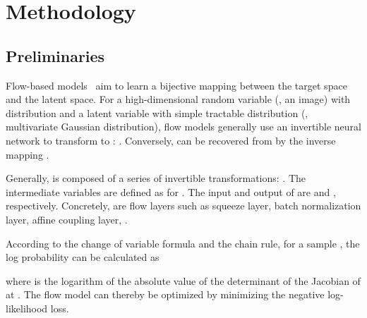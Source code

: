 \documentclass[10pt,twocolumn,letterpaper]{article}
\begin{document}
\section{Methodology}
\subsection{Preliminaries}
Flow-based models~\cite{dinh2014nice, dinh2016realnvp, kingma2016iaf, papamakarios2017maf, huang2018naf, kingma2018glow, ardizzone2018analyzingIRN, jaini2019polyflow, ho2019flow++, nielsen2020survae, liang2021fkp} aim to learn a bijective mapping between the target space and the latent space.
For a high-dimensional random variable (\eg, an image)  with distribution  and a latent variable  with simple tractable distribution  (\eg, multivariate Gaussian distribution), flow models generally use an invertible neural network  to transform  to : .
Conversely,  can be recovered from  by the inverse mapping . 

Generally,  is composed of a series of invertible transformations: . The intermediate variables are defined as  for . The input  and output  of  are  and , respectively. Concretely,  are flow layers such as squeeze layer, batch normalization layer, affine coupling layer, \etc.

According to the change of variable formula and the chain rule, for a sample , the log probability  can be calculated as

where  is the logarithm of the absolute value of the determinant of the Jacobian of  at . The flow model can thereby be optimized by minimizing the negative log-likelihood loss.
\end{document}
